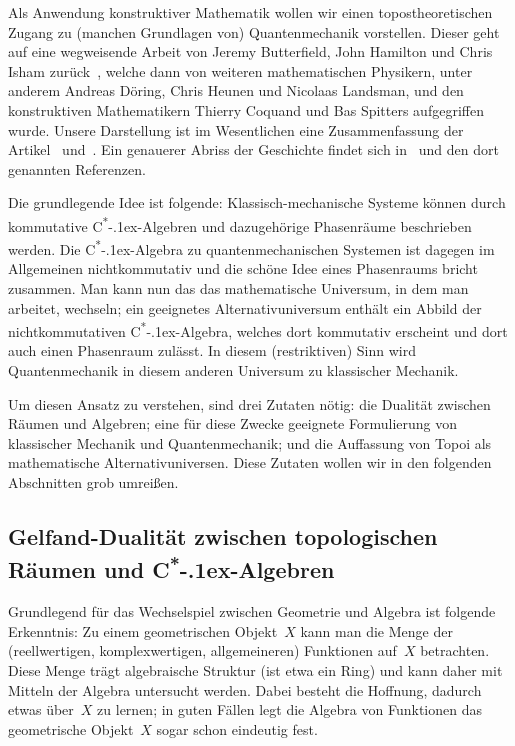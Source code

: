 \documentclass[a4paper,ngerman,12pt]{scrartcl}
\theoremstyle{definition}
\theoremstyle{plain}
\theoremstyle{remark}
\newcommand{\csalgebra}{C\textsuperscript{*}\kern-.1ex-Algebra}
\newcommand{\csalgebren}{C\textsuperscript{*}\kern-.1ex-Alge\-bren}
\renewcommand{\_}{\mathpunct{.}\,}
\newcommand{\?}{\,{:}\,}
\begin{document}
Als Anwendung konstruktiver Mathematik wollen wir einen topostheoretischen
Zugang zu (manchen Grundlagen von) Quantenmechanik vorstellen. Dieser geht auf
eine wegweisende Arbeit von Jeremy Butterfield, John Hamilton und Chris Isham
zurück~\cite{butterfield:hamilton:isham:1}, welche dann von weiteren
mathematischen Physikern, unter anderem Andreas Döring, Chris Heunen und Nicolaas
Landsman, und den konstruktiven Mathematikern Thierry Coquand und Bas Spitters
aufgegriffen wurde. Unsere Darstellung ist im Wesentlichen eine Zusammenfassung
der Artikel~\cite{topos:aqt} und~\cite{nlab:bohrtopos}. Ein genauerer Abriss
der Geschichte findet sich in~\cite{nlab:bohrtopos} und den dort genannten
Referenzen.

Die grundlegende Idee ist folgende:
Klassisch-mechanische Systeme können durch kommutative \csalgebren{} und
dazugehörige Phasenräume beschrieben werden. Die \csalgebra{} zu
quantenmechanischen Systemen ist dagegen im Allgemeinen nichtkommutativ und die
schöne Idee eines Phasenraums bricht zusammen. Man kann nun das das
mathematische Universum, in dem man arbeitet, wechseln; ein geeignetes
Alternativuniversum enthält ein Abbild der nichtkommutativen \csalgebra,
welches dort kommutativ erscheint und dort auch einen Phasenraum zulässt. In
diesem (restriktiven) Sinn wird Quantenmechanik in diesem anderen Universum zu
klassischer Mechanik.

Um diesen Ansatz zu verstehen, sind drei Zutaten nötig: die Dualität zwischen
Räumen und Algebren; eine für diese Zwecke geeignete Formulierung von
klassischer Mechanik und Quantenmechanik; und die Auffassung von Topoi als
mathematische Alternativuniversen. Diese Zutaten wollen wir in den folgenden
Abschnitten grob umreißen.


\subsection{Gelfand-Dualität zwischen topologischen Räumen und \csalgebren}

Grundlegend für das Wechselspiel zwischen Geometrie und Algebra ist folgende
Erkenntnis: Zu einem geometrischen Objekt~$X$ kann man die Menge der
(reellwertigen, komplexwertigen, allgemeineren) Funktionen auf~$X$ betrachten.
Diese Menge trägt algebraische Struktur (ist etwa ein Ring) und kann daher mit
Mitteln der Algebra untersucht werden. Dabei besteht die Hoffnung, dadurch
etwas über~$X$ zu lernen; in guten Fällen legt die Algebra von Funktionen
das geometrische Objekt~$X$ sogar schon eindeutig fest.
\end{document}
